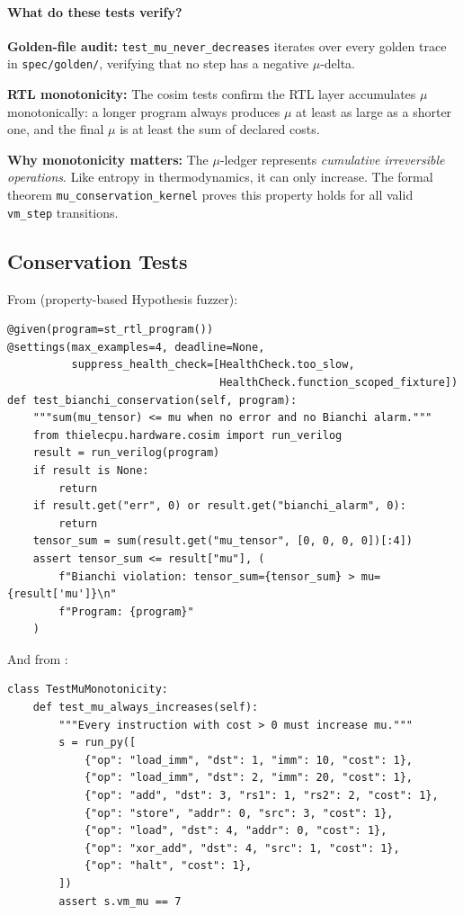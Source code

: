 \paragraph{What do these tests verify?}

\textbf{Golden-file audit:} \texttt{test\_mu\_never\_decreases} iterates over every golden trace in \texttt{spec/golden/}, verifying that no step has a negative $\mu$-delta.

\textbf{RTL monotonicity:} The cosim tests confirm the RTL layer accumulates $\mu$ monotonically: a longer program always produces $\mu$ at least as large as a shorter one, and the final $\mu$ is at least the sum of declared costs.

\textbf{Why monotonicity matters:} The $\mu$-ledger represents \textit{cumulative irreversible operations}. Like entropy in thermodynamics, it can only increase. The formal theorem \texttt{mu\_conservation\_kernel} proves this property holds for all valid \texttt{vm\_step} transitions.

\subsection{Conservation Tests}

From  (property-based Hypothesis fuzzer):
\begin{lstlisting}
@given(program=st_rtl_program())
@settings(max_examples=4, deadline=None,
          suppress_health_check=[HealthCheck.too_slow,
                                 HealthCheck.function_scoped_fixture])
def test_bianchi_conservation(self, program):
    """sum(mu_tensor) <= mu when no error and no Bianchi alarm."""
    from thielecpu.hardware.cosim import run_verilog
    result = run_verilog(program)
    if result is None:
        return
    if result.get("err", 0) or result.get("bianchi_alarm", 0):
        return
    tensor_sum = sum(result.get("mu_tensor", [0, 0, 0, 0])[:4])
    assert tensor_sum <= result["mu"], (
        f"Bianchi violation: tensor_sum={tensor_sum} > mu={result['mu']}\n"
        f"Program: {program}"
    )
\end{lstlisting}

And from :
\begin{lstlisting}
class TestMuMonotonicity:
    def test_mu_always_increases(self):
        """Every instruction with cost > 0 must increase mu."""
        s = run_py([
            {"op": "load_imm", "dst": 1, "imm": 10, "cost": 1},
            {"op": "load_imm", "dst": 2, "imm": 20, "cost": 1},
            {"op": "add", "dst": 3, "rs1": 1, "rs2": 2, "cost": 1},
            {"op": "store", "addr": 0, "src": 3, "cost": 1},
            {"op": "load", "dst": 4, "addr": 0, "cost": 1},
            {"op": "xor_add", "dst": 4, "src": 1, "cost": 1},
            {"op": "halt", "cost": 1},
        ])
        assert s.vm_mu == 7
\end{lstlisting}

